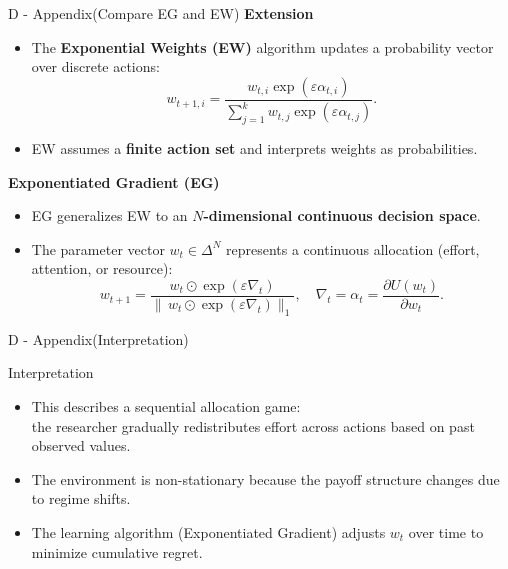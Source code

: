 \documentclass{beamer}
\begin{document}
\begin{frame}{D - Appendix(Compare EG and EW)}
\textbf{Extension}
    \begin{itemize}
        \item The \textbf{Exponential Weights (EW)} algorithm updates 
              a probability vector over discrete actions:
              \[
              w_{t+1,i} 
              = 
              \frac{
                  w_{t,i} \exp(\varepsilon \alpha_{t,i})
              }{
                  \sum_{j=1}^{k} w_{t,j} \exp(\varepsilon \alpha_{t,j})
              }.
              \]
        \item EW assumes a \textbf{finite action set} and interprets weights as probabilities.
    \end{itemize}
\textbf{Exponentiated Gradient (EG)}
    \begin{itemize}
        \item EG generalizes EW to an \textbf{$N$-dimensional continuous decision space}.
        \item The parameter vector $w_t \in \Delta^N$ represents 
              a continuous allocation (effort, attention, or resource):
              \[
              w_{t+1}
              = 
              \frac{
                  w_t \odot \exp(\varepsilon \nabla_t)
              }{
                  \|\,w_t \odot \exp(\varepsilon \nabla_t)\|_1
              },
              \quad
              \nabla_t = \alpha_t = \frac{\partial U(w_t)}{\partial w_t}.
              \]
    \end{itemize}
\end{frame}

\begin{frame}{D - Appendix(Interpretation)}
    \begin{block}{Interpretation}
    \begin{itemize}
        \item This describes a sequential allocation game:\\
              the researcher gradually redistributes effort across actions
              based on past observed values.
        \item The environment is non-stationary because
              the payoff structure changes due to regime shifts.
        \item The learning algorithm (Exponentiated Gradient)
              adjusts $w_t$ over time to minimize cumulative regret.
    \end{itemize}
    \end{block}
\end{frame}
\end{document}
